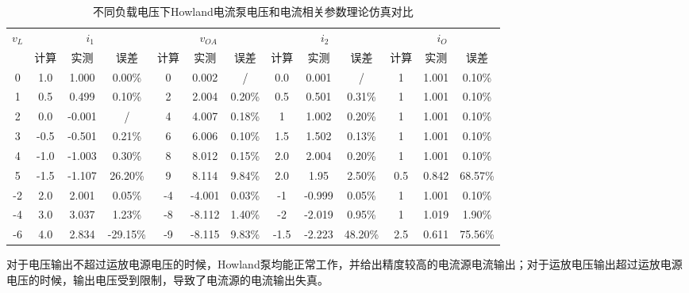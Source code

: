 \documentclass[./测控三级项目.tex]{subfiles} %
\begin{document}
			\begin{table}[h!]
				\centering
				\caption{不同负载电压下Howland电流泵电压和电流相关参数理论仿真对比}
				\label{tab:不同负载电压下Howland电流泵电压和电流相关参数理论仿真对比}
				\begin{tabular}{|c|c|c|c|c|c|c|c|c|c|c|c|c|}
					\hline
					\multirow{2}{*}{$v_L$} & \multicolumn{3}{c|}{$i_1$} & \multicolumn{3}{c|}{$v_{OA}$}  & \multicolumn{3}{c|}{$i_2$} &\multicolumn{3}{c|}{$i_O$}  \\
					\cline{2-13}
					 & 计算 & 实测 & 误差 & 计算 & 实测 & 误差 & 计算 & 实测 & 误差 & 计算 & 实测 & 误差\\
					\hline
					0 &  1.0 &  1.000 & 0.00\% &0 &0.002 & /	  &0.0 &0.001 & / & 1 & 1.001 & 0.10\%\\
					\hline
					1 &  0.5 &  0.499 & 0.10\% &2 &2.004 & 0.20\% &0.5 &0.501 & 0.31\% & 1 & 1.001 &  0.10\%\\
					\hline
					2 &  0.0 & -0.001 & /      &4 &4.007 & 0.18\% &1 &1.002 & 0.20\% & 1 & 1.001 & 0.10\%\\
					\hline
					3 & -0.5 & -0.501 & 0.21\% &6 &6.006 & 0.10\% &1.5 &1.502 & 0.13\% & 1 & 1.001 & 0.10\%\\
					\hline
					4 & -1.0 & -1.003 & 0.30\% &8 &8.012 & 0.15\% &2.0 &2.004 & 0.20\% & 1 & 1.001 & 0.10\%\\
					\hline
					5 & -1.5 & -1.107 & 26.20\% &9 &8.114 & 9.84\% &2.0 &1.95 & 2.50\% & 0.5 & 0.842 & 68.57\%\\
					\hline
					-2 &2.0 &  2.001 & 0.05\% &-4 &-4.001 & 0.03\% &-1 &-0.999 & 0.05\% & 1 & 1.001 & 0.10\%\\
					\hline
					-4 &3.0 &  3.037 & 1.23\% &-8 &-8.112 & 1.40\% &-2 &-2.019 & 0.95\% & 1 & 1.019 & 1.90\%\\
					\hline
					-6 &4.0 &  2.834 & -29.15\% &-9 &-8.115 & 9.83\% &-1.5 &-2.223 & 48.20\% & 2.5 & 0.611 & 75.56\%\\
					\hline
				\end{tabular}
			\end{table}	\par
			对于电压输出不超过运放电源电压的时候，Howland泵均能正常工作，并给出精度较高的电流源电流输出；对于运放电压输出超过运放电源电压的时候，输出电压受到限制，导致了电流源的电流输出失真。
			
\end{document}
